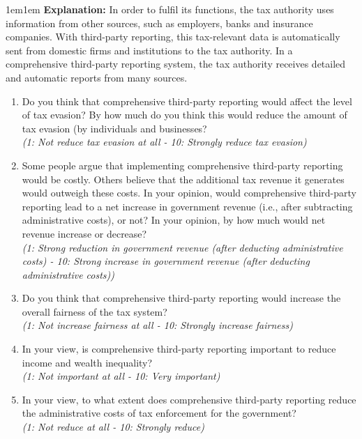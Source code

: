 \documentclass[11pt]{article}
\begin{document}
\begin{adjustwidth}{1em}{1em}  \textbf{Explanation:} In order to fulfil its functions, the tax authority uses information from other sources, such as employers, banks and insurance companies. With third-party reporting, this tax-relevant data is automatically sent from domestic firms and institutions to the tax authority. In a comprehensive third-party reporting system, the tax authority receives detailed and automatic reports from many sources.
\end{adjustwidth}
\begin{enumerate}[resume]
    \item Do you think that comprehensive third-party reporting would affect the level of tax evasion? By how much do you think this would reduce the amount of tax evasion (by individuals and businesses?\\
    \textit{(1: Not reduce tax evasion at all - 10: Strongly reduce tax evasion)}
    \item Some people argue that implementing comprehensive third-party reporting would be costly. Others believe that the additional tax revenue it generates would outweigh these costs. In your opinion, would comprehensive third-party reporting lead to a net increase in government revenue (i.e., after subtracting administrative costs), or not? In your opinion, by how much would net revenue increase or decrease?  \\
    \textit{(1: Strong reduction in government revenue (after deducting administrative costs) - 10: Strong increase in government revenue (after deducting administrative costs))}
    \item Do you think that comprehensive third-party reporting would increase the overall fairness of the tax system?\\
    \textit{(1: Not increase fairness at all - 10: Strongly increase fairness)}
    \item In your view, is comprehensive third-party reporting important to reduce income and wealth inequality?\\
    \textit{(1: Not important at all - 10: Very important)}
    \item In your view, to what extent does comprehensive third-party reporting reduce the administrative costs of tax enforcement for the government?\\
    \textit{(1: Not reduce at all - 10: Strongly reduce)}


\end{enumerate}
\end{document}
